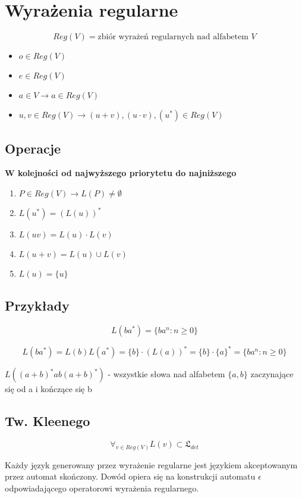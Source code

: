 \documentclass{../notatki}
\begin{document}
\section{Wyrażenia regularne}

$$
Reg(V) = \text{zbiór wyrażeń regularnych nad alfabetem } V
$$

\begin{itemize}
  \item $o \in Reg(V)$
  \item $e \in Reg(V)$
  \item $a \in V \rightarrow a \in Reg(V)$
  \item $u, v \in Reg(V) \rightarrow (u + v), (u \cdot v), (u^*) \in Reg(V)$
\end{itemize}

\subsection{Operacje}

\textbf{W kolejności od najwyższego priorytetu do najniższego}

\begin{enumerate}
  \item $P \in Reg(V) \rightarrow L(P) \ne \emptyset$
  \item $L(u^*) = (L(u))^*$
  \item $L(uv) = L(u) \cdot L(v)$
  \item $L(u + v) = L(u) \cup L(v)$
  \item $L(u) = \{u\}$
\end{enumerate}

\subsection{Przykłady}

$$
L(ba^*) = \{ba^n : n \ge 0\}
$$

$$
L(ba^*) = L(b)L(a^*) = \{b\} \cdot (L(a))^* = \{b\} \cdot \{a\}^* =
\{ba^n : n \ge 0\}
$$

$L((a + b)^*ab(a + b)^*)$ - wszystkie słowa nad alfabetem $\{a, b\}$
zaczynające się od a i kończące się b

\subsection{Tw. Kleenego}

$$
\forall_{v \in Reg(V)}L(v) \subset \mathfrak{L}_{det}
$$

Każdy język generowany przez wyrażenie regularne jest językiem
akceptowanym przez automat skończony.
Dowód opiera się na konstrukcji automatu $\epsilon$ odpowiadającego
operatorowi wyrażenia regularnego.
\end{document}
